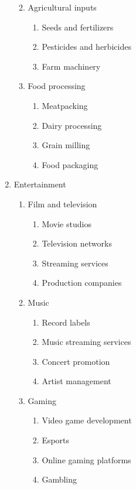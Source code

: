 \begin{enumerate}
\begin{enumerate}
\begin{enumerate}
        \end{enumerate}
        \item Agricultural inputs
        \begin{enumerate}
            \item Seeds and fertilizers
            \item Pesticides and herbicides
            \item Farm machinery
        \end{enumerate}
        \item Food processing
        \begin{enumerate}
            \item Meatpacking
            \item Dairy processing
            \item Grain milling
            \item Food packaging
        \end{enumerate}
    \end{enumerate}
    \item Entertainment
    \begin{enumerate}
        \item Film and television
        \begin{enumerate}
            \item Movie studios
            \item Television networks
            \item Streaming services
            \item Production companies
        \end{enumerate}
        \item Music
        \begin{enumerate}
            \item Record labels
            \item Music streaming services
            \item Concert promotion
            \item Artist management
        \end{enumerate}
        \item Gaming
        \begin{enumerate}
            \item Video game development
            \item Esports
            \item Online gaming platforms
            \item Gambling

\end{enumerate}
\end{enumerate}
\end{enumerate}
